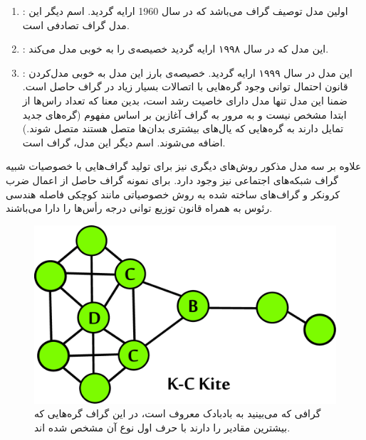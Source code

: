 \begin {persian}
\begin{enumerate}
\item
{}\cite{Erdős60onthe}:
اولین مدل توصیف گراف می‌باشد که در سال 1960 ارایه گردید. اسم دیگر این مدل گراف تصادفی است.

\item
{}\cite{watts1998collective}:
این مدل که در سال ۱۹۹۸ ارایه گردید خصیصه‌ی
 را به خوبی مدل می‌کند.

\item
{}\cite{barabasi1999emergence}:
این مدل در سال ۱۹۹۹ ارایه گردید. خصیصه‌ی بارز این مدل به خوبی مدل‌کردن قانون احتمال توانی وجود گره‌هایی با اتصالات بسیار زیاد در گراف حاصل است. ضمنا این مدل تنها مدل دارای خاصیت رشد است، بدین معنا که تعداد راس‌ها از ابتدا مشخص نیست و به مرور به گراف آغازین بر اساس مفهوم (گره‌های جدید تمایل دارند به گره‌هایی که یال‌های بیشتری بدان‌ها متصل هستند متصل شوند.) اضافه می‌شوند. اسم دیگر این مدل، گراف  است.

\end{enumerate}

علاوه بر سه مدل مذکور روش‌های دیگری نیز برای تولید گراف‌هایی با خصوصیات شبیه گراف شبکه‌های اجتماعی نیز وجود دارد. برای نمونه گراف‌ حاصل از اعمال ضرب کرونکر\cite{leskovec2010kronecker} و گراف‌های ساخته شده به روش \cite{leskovec2005graphs} خصوصیاتی مانند کوچکی فاصله هندسی رئوس به همراه قانون توزیع توانی درجه رأس‌ها را دارا می‌باشند.

\begin{figure}[H]
 \centering
 \includegraphics[scale=0.17]{figures/bcd}
 \caption[بادبادک ]
 { گرافی که می‌بینید به بادبادک  معروف است، در این گراف گره‌هایی که بیشترین مقادیر  را دارند با حرف اول نوع آن مشخص شده اند.}
\end{figure}


\end{persian}

